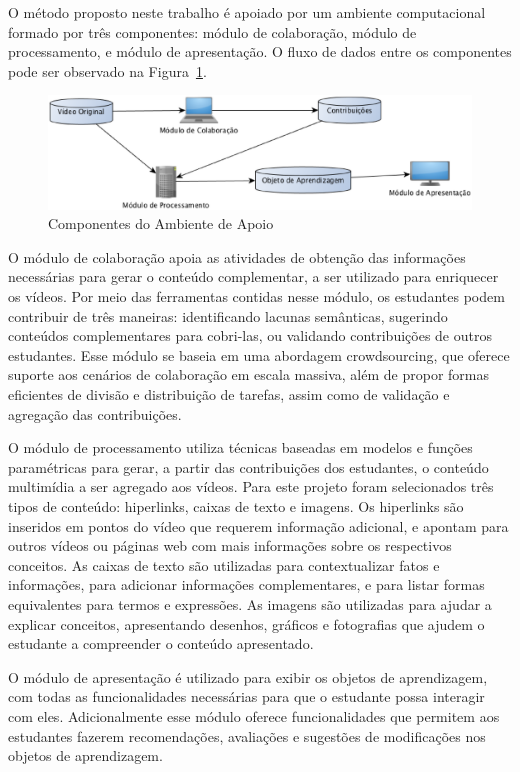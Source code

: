 O método proposto neste trabalho é apoiado por um ambiente computacional formado por três componentes: módulo de colaboração, módulo de processamento, e módulo de apresentação. O fluxo de dados entre os componentes pode ser observado na Figura~\ref{fig:ambiente}.

\begin{figure}[ht]
\centering
\includegraphics[width=.99\textwidth]{imagens/ambiente.eps}
\caption{Componentes do Ambiente de Apoio}
\label{fig:ambiente}
\end{figure}

O módulo de colaboração apoia as atividades de obtenção das informações necessárias para gerar o conteúdo complementar, a ser utilizado para enriquecer os vídeos. Por meio das ferramentas contidas nesse módulo, os estudantes podem contribuir de três maneiras: identificando lacunas semânticas, sugerindo conteúdos complementares para cobri-las, ou validando contribuições de outros estudantes. Esse módulo se baseia em uma abordagem crowdsourcing, que oferece suporte aos cenários de colaboração em escala massiva, além de propor formas eficientes de divisão e distribuição de tarefas, assim como de validação e agregação das contribuições. 

O módulo de processamento utiliza técnicas baseadas em modelos e funções paramétricas para gerar, a partir das contribuições dos estudantes, o conteúdo multimídia a ser agregado aos vídeos. Para este projeto foram selecionados três tipos de conteúdo: hiperlinks, caixas de texto e imagens. Os hiperlinks são inseridos em pontos do vídeo que requerem informação adicional, e apontam para outros vídeos ou páginas web com mais informações sobre os respectivos conceitos. As caixas de texto são utilizadas para contextualizar fatos e informações, para adicionar informações complementares, e para listar formas equivalentes para termos e expressões. As imagens são utilizadas para ajudar a explicar conceitos, apresentando desenhos, gráficos e fotografias que ajudem o estudante a compreender o conteúdo apresentado. 

O módulo de apresentação é utilizado para exibir os objetos de aprendizagem, com todas as funcionalidades necessárias para que o estudante possa interagir com eles. Adicionalmente esse módulo oferece funcionalidades que permitem aos estudantes fazerem recomendações, avaliações e sugestões de modificações nos objetos de aprendizagem.
